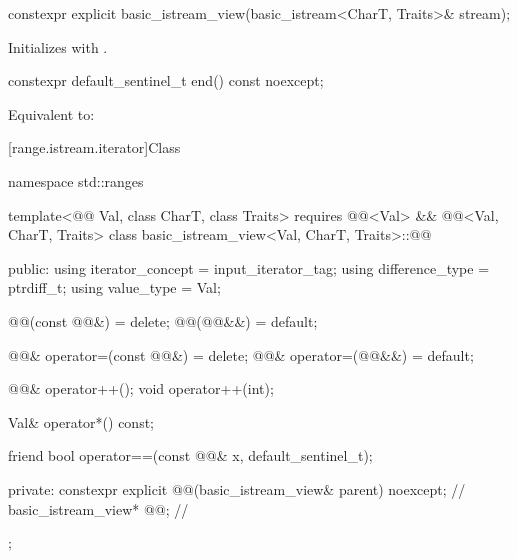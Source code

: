 %
\begin{itemdecl}
constexpr explicit basic_istream_view(basic_istream<CharT, Traits>& stream);
\end{itemdecl}

\begin{itemdescr}
\pnum
\effects
Initializes  with .
\end{itemdescr}

%
\begin{itemdecl}
constexpr default_sentinel_t end() const noexcept;
\end{itemdecl}

\begin{itemdescr}
\pnum
\effects
Equivalent to: 
\end{itemdescr}

[range.istream.iterator]{Class }

%
\begin{codeblock}
namespace std::ranges {
  template<@@ Val, class CharT, class Traits>
    requires @@<Val> &&
             @@<Val, CharT, Traits>
  class basic_istream_view<Val, CharT, Traits>::@@ {
  public:
    using iterator_concept = input_iterator_tag;
    using difference_type = ptrdiff_t;
    using value_type = Val;

    @@(const @@&) = delete;
    @@(@@&&) = default;

    @@& operator=(const @@&) = delete;
    @@& operator=(@@&&) = default;

    @@& operator++();
    void operator++(int);

    Val& operator*() const;

    friend bool operator==(const @@& x, default_sentinel_t);

  private:
    constexpr explicit @@(basic_istream_view& parent) noexcept;   // \expos
    basic_istream_view* @@;                                        // \expos
  };
}
\end{codeblock}


